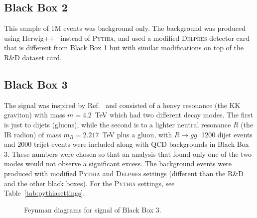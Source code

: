 \documentclass[a4paper,11pt]{article}
\begin{document}
\subsection{Black Box 2}
\label{sec:challenge_bb2}

This sample of 1M events was background only. The background was produced using Herwig++~\cite{Bahr:2008pv} instead of \textsc{Pythia}, and used a modified \textsc{Delphes} detector card that is different from Black Box 1 but with similar modifications on top of the R\&D dataset card. 

\subsection{Black Box 3}
\label{sec:challenge_bb3}

The signal was inspired by Ref.~\cite{Agashe:2016rle,Agashe:2016kfr} and consisted of a heavy resonance (the KK graviton) with mass $m=4.2$~TeV which had two different decay modes. The first is just to dijets (gluons), while the second is to a lighter neutral resonance $R$ (the IR radion) of mass $m_{R}=2.217$~TeV plus a gluon, with $R\to gg$. 1200 dijet events and 2000 trijet events were included along with QCD backgrounds in Black Box 3.  These numbers were chosen so that an analysis that found only one of the two modes would not observe a significant excess.  The background events were produced with modified \textsc{Pythia} and \textsc{Delphes} settings (different than the R\&D and the other black boxes). For the \textsc{Pythia} settings, see Table~\ref{tab:pythiasettings}.

\begin{figure}[h!]
\centering



\caption{Feynman diagrams for signal of Black Box 3.}
\label{fig:bb3sig}
\end{figure}
\end{document}
